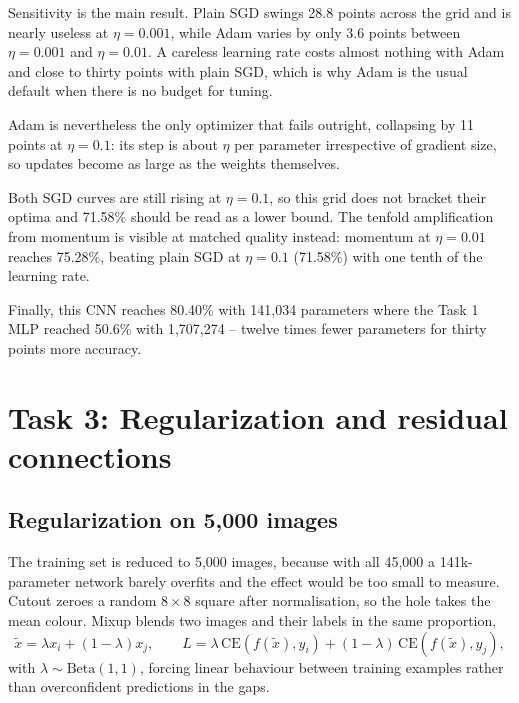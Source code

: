 \documentclass[11pt,a4paper]{article}
\begin{document}
Sensitivity is the main result. Plain SGD swings 28.8 points across the grid and
is nearly useless at $\eta = 0.001$, while Adam varies by only 3.6 points
between $\eta = 0.001$ and $\eta = 0.01$. A careless learning rate costs almost
nothing with Adam and close to thirty points with plain SGD, which is why Adam
is the usual default when there is no budget for tuning.

Adam is nevertheless the only optimizer that fails outright, collapsing by 11
points at $\eta = 0.1$: its step is about $\eta$ per parameter irrespective of
gradient size, so updates become as large as the weights themselves.

Both SGD curves are still rising at $\eta = 0.1$, so this grid does not bracket
their optima and 71.58\% should be read as a lower bound. The tenfold
amplification from momentum is visible at matched quality instead: momentum at
$\eta = 0.01$ reaches 75.28\%, beating plain SGD at $\eta = 0.1$ (71.58\%) with
one tenth of the learning rate.

Finally, this CNN reaches 80.40\% with 141{,}034 parameters where the Task 1 MLP
reached 50.6\% with 1{,}707{,}274 -- twelve times fewer parameters for thirty
points more accuracy.

\section{Task 3: Regularization and residual connections}

\subsection{Regularization on 5{,}000 images}

The training set is reduced to 5{,}000 images, because with all 45{,}000 a
141k-parameter network barely overfits and the effect would be too small to
measure. Cutout zeroes a random $8\times8$ square after normalisation, so the
hole takes the mean colour. Mixup blends two images and their labels in the
same proportion,
%
\begin{equation}
\tilde x = \lambda x_i + (1-\lambda) x_j, \qquad
L = \lambda\,\mathrm{CE}(f(\tilde x), y_i) + (1-\lambda)\,\mathrm{CE}(f(\tilde x), y_j),
\end{equation}
%
with $\lambda \sim \mathrm{Beta}(1,1)$, forcing linear behaviour between
training examples rather than overconfident predictions in the gaps.
\end{document}
